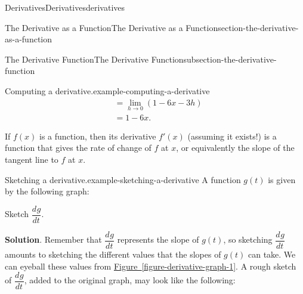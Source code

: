 \documentclass[oneside,10pt,]{book}
\numberwithin{equation}{section}
\newcommand{\dv}[3][]{\dfrac{d^{#1} #2}{d #3^{#1}}}
\begin{document}
\begin{chapterptx}{Derivatives}{}{Derivatives}{}{}{derivatives}
\begin{sectionptx}{The Derivative as a Function}{}{The Derivative as a Function}{}{}{section-the-derivative-as-a-function}
\begin{subsectionptx}{The Derivative Function}{}{The Derivative Function}{}{}{subsection-the-derivative-function}
\begin{example}{Computing a derivative.}{example-computing-a-derivative}
\begin{align*}
& = \lim_{h\to0}(1-6x-3h) \\
& = 1-6x. 
\end{align*}
%
\end{example}
\hypertarget{p-104}{}%
If \(f(x)\) is a function, then its derivative \(f'(x)\) (assuming it exists!) is a function that gives the rate of change of \(f\) at \(x\), or equivalently the slope of the tangent line to \(f\) at \(x\).%
\begin{example}{Sketching a derivative.}{example-sketching-a-derivative}%
\hypertarget{p-105}{}%
A function \(g(t)\) is given by the following graph: \begin{figure}
\centering
{
}
\end{figure}
%
\par
\hypertarget{p-106}{}%
Sketch \(\dv{g}{t}\).%
\par\smallskip%
\noindent\textbf{Solution}.\hypertarget{solution-23}{}\quad%
\hypertarget{p-107}{}%
Remember that \(\dv{g}{t}\) represents the slope of \(g(t)\), so sketching \(\dv{g}{t}\) amounts to sketching the different values that the slopes of \(g(t)\) can take. We can eyeball these values from \hyperref[figure-derivative-graph-1]{Figure~\ref{figure-derivative-graph-1}}. A rough sketch of \(\dv{g}{t}\), added to the original graph, may look like the following: \begin{figure}
\centering
{
}
\end{figure}
\end{example}
\end{subsectionptx}
\end{sectionptx}
\end{chapterptx}
\end{document}
